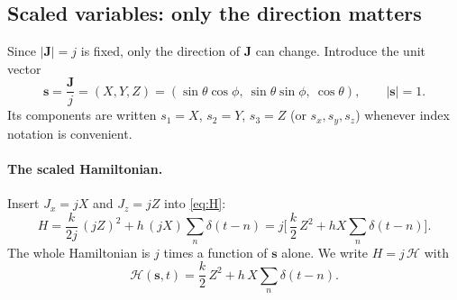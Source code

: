 \documentclass[11pt,a4paper]{article}
\newcommand{\vs}{\bm{s}}
\newcommand{\vJ}{\bm{J}}
\begin{document}
\subsection{Scaled variables: only the direction matters}\label{sec:scaled}

Since $|\vJ| = j$ is fixed, only the direction of $\vJ$ can change. Introduce the unit vector
\begin{equation}\label{eq:unit}
  \vs = \frac{\vJ}{j} = (X, Y, Z) = (\sin\theta\cos\phi,\ \sin\theta\sin\phi,\ \cos\theta), \qquad |\vs| = 1 .
\end{equation}
Its components are written $s_1 = X$, $s_2 = Y$, $s_3 = Z$ (or $s_x, s_y, s_z$) whenever index notation is
convenient.

\paragraph{The scaled Hamiltonian.} Insert $J_x = jX$ and $J_z = jZ$ into \eqref{eq:H}:
\begin{equation*}
  H = \frac{k}{2j}\,(jZ)^2 + h\,(jX) \sum_n\delta(t-n)
    = j\Big[\,\frac{k}{2}\,Z^2 + hX \sum_n\delta(t-n)\Big].
\end{equation*}
The whole Hamiltonian is $j$ times a function of $\vs$ alone. We write $H = j\,\mathcal H$ with
\begin{equation}\label{eq:h}
  \mathcal H(\vs,t) = \frac{k}{2}\, Z^2 + h\, X \sum_n \delta(t-n).
\end{equation}
\end{document}
